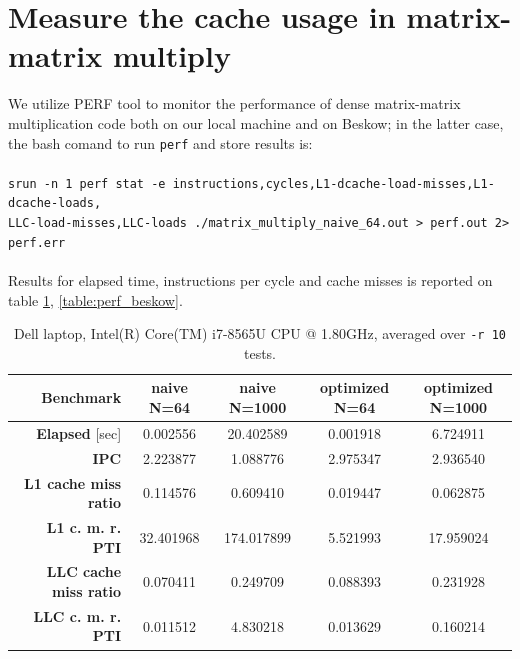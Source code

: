 \documentclass[a4paper]{article}
\begin{document}
\newpage
\section{Measure the cache usage in matrix-matrix multiply}

We utilize PERF tool to monitor the performance of dense matrix-matrix multiplication code both on our local machine and on Beskow; in the latter case, the bash comand to run \texttt{perf} and store results is:\\
\\
\texttt{srun -n 1 perf stat -e instructions,cycles,L1-dcache-load-misses,L1-dcache-loads,} \\
\null\quad\texttt{LLC-load-misses,LLC-loads ./matrix\_multiply\_naive\_64.out > perf.out 2> perf.err}\\
\\
Results for elapsed time, instructions per cycle and cache misses is reported on table \ref{table:perf_laptop}, \ref{table:perf_beskow}.

\begin{table}
\begin{center}
\begin{tabular}{ r||c|c|c|c| } 
 \hline
 \textbf{Benchmark} & naive N=64 & naive N=1000 & optimized N=64 & optimized N=1000 \\
 \hline
 \hline
 \textbf{Elapsed} [sec]	& 0.002556 & 20.402589 & 0.001918 & 6.724911 \\
 \textbf{IPC} & 2.223877 & 1.088776 & 2.975347 & 2.936540 \\
 \textbf{L1 cache miss ratio} & 0.114576 & 0.609410	& 0.019447 & 0.062875 \\
 \textbf{L1 c. m. r. PTI} & 32.401968 & 174.017899 & 5.521993 & 17.959024 \\ 
 \textbf{LLC cache miss ratio} & 0.070411 & 0.249709 & 0.088393 & 0.231928 \\
 \textbf{LLC c. m. r. PTI} & 0.011512 & 4.830218 & 0.013629 & 0.160214 \\
 \hline
\end{tabular}
\caption{Dell laptop, Intel(R) Core(TM) i7-8565U CPU @ 1.80GHz, averaged over \texttt{-r 10} tests.}
\label{table:perf_laptop}
\end{center}
\end{table}
\end{document}
